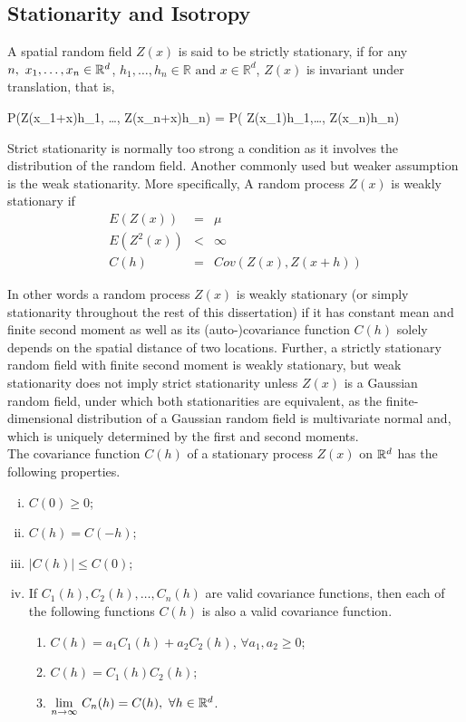 \subsection{Stationarity and Isotropy}

A spatial random field $Z(x)$ is said to be strictly stationary, if for any $n,\ x_1,\ldots, x_n \in \mathbb{R}^d$, $h_1, \ldots, h_n\in\mathbb{R} \mbox{ and } x\in \mathbb{R}^d$, $Z(x)$ is invariant under translation, that is,

\beq
P(Z(x_1+x)\le h_1, \ldots, Z(x_n+x)\le h_n) = P( Z(x_1)\le h_1,\ldots, Z(x_n)\le h_n)
\eeq

Strict stationarity is normally too strong a condition as it involves the distribution of the random field. Another commonly used but weaker assumption is the weak stationarity. More specifically, A random process $Z(x)$ is weakly stationary if
\begin{eqnarray}
	E(Z(x))   & = & \mu \nonumber \\
	E(Z^2(x)) & < & \infty \nonumber \\
	C(h)      & = & Cov(Z(x),Z(x+h))
\end{eqnarray}

In other words a random process $Z(x)$ is weakly stationary (or simply stationarity throughout the rest of this dissertation) if it has constant mean and finite second moment as well as its (auto-)covariance function $C(h)$ solely depends on the spatial distance of two locations. Further, a strictly stationary random field with finite second moment is weakly stationary, but weak stationarity does not imply strict stationarity unless $Z(x)$ is a Gaussian random field, under which both stationarities are equivalent, as the finite-dimensional distribution of a Gaussian random field is multivariate normal and, which is uniquely determined by the first and second moments. \\

The covariance function $C(h)$ of a stationary process $Z(x)$ on $\mathbb{R}^d$ has the following properties.

\begin{enumerate}[(i)]
	\item $C(0) \ge 0$;
	\item $C(h) = C(-h)$;
	\item $|C(h)| \le  C(0)$;
	\item If $C_1(h), C_2(h), \ldots, C_n(h)$ are valid covariance functions, then each of the following functions $C(h)$ is also a valid covariance function.
	
	      \begin{enumerate}
	      	\item $C(h) = a_1C_1(h)+a_2C_2(h)$, $\forall a_1,a_2\ge 0$;
	      	\item $C(h) = C_1(h)C_2(h)$;
	      	\item $\underset{n\to\infty} {\lim}\ C_n(h)=C(h),\ \forall h\in \R^d$.
	      \end{enumerate}
	
\end{enumerate}

